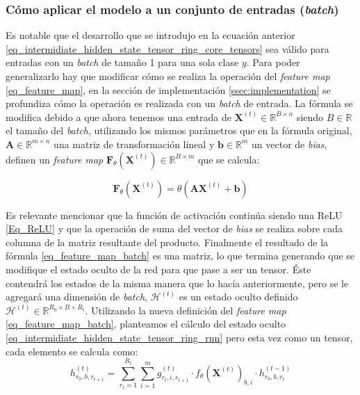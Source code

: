 \documentclass[spanish]{article}
\theoremstyle{definition}
\theoremstyle{remark}
\numberwithin{equation}{section}
\numberwithin{equation}{section} %
\begin{document}
\subsubsection{Cómo aplicar el modelo a un conjunto de entradas ({\it batch})}

Es notable que el desarrollo que se introdujo en la ecuación anterior \eqref{eq_intermidiate_hidden_state_tensor_ring_core_tensors} sea válido para entradas con un \textit{batch} de tamaño 1 para una sola clase $y$. Para poder generalizarlo hay que modificar cómo se realiza la operación del \textit{feature map} \eqref{eq_feature_map}, en la sección de implementación \ref{ssec:implementation} se profundiza cómo la operación es realizada con un \textit{batch} de entrada. La fórmula se modifica debido a que ahora tenemos una entrada de $\boldsymbol{X}^{(t)} \in \mathbb{R}^{B \times n}$ siendo $B \in \mathbb{R}$ el tamaño del \textit{batch}, utilizando los mismos parámetros que en la fórmula original, $\boldsymbol{A} \in \mathbb{R}^{m \times n}$ una matriz de transformación lineal y $\boldsymbol{b} \in \mathbb{R}^{m}$ un vector de \textit{bias}, definen un \textit{feature map} $\boldsymbol{F}_\theta(\boldsymbol{X}^{(t)}) \in \mathbb{R}^{B\times m}$ que se calcula:
\par
\begin{equation}
\label{eq_feature_map_batch}
\boldsymbol{F}_\theta(\boldsymbol{X}^{(t)})=\theta(\boldsymbol{A}\boldsymbol{X}^{(t)} +\boldsymbol{b})
\end{equation}\par
Es relevante mencionar que la función de activación continúa siendo una ReLU \eqref{Eq_ReLU} y que la operación de suma del vector de \textit{bias} se realiza sobre cada columna de la matriz resultante del producto. Finalmente el resultado de la fórmula \eqref{eq_feature_map_batch} es una matriz, lo que termina generando que se modifique el estado oculto de la red para que pase a ser un tensor. Éste contendrá los estados de la misma manera que lo hacía anteriormente, pero se le agregará una dimensión de \textit{batch}, $\mathcal{H}^{(t)}$ es un estado oculto definido $\mathcal{H}^{(t)} \in \mathbb{R}^{R_0 \times B \times R_t}$. Utilizando la nueva definición del \textit{feature map} \eqref{eq_feature_map_batch}, planteamos el cálculo del estado oculto \eqref{eq_intermidiate_hidden_state_tensor_ring_rnn} pero esta vez como un tensor, cada elemento se calcula como:
\begin{equation}
\label{eq_intermidiate_hidden_state_tensor_ring_core_tensors_element_with_batch}
h^{(t)}_{r_{0},b,r_{t+1}}  = \sum^{R_{t}}_{r_{t}=1} \sum_{i=1}^m  g^{(t)}_{r_t,i,r_{t+1}} \cdot f_\theta(\boldsymbol{X}^{(t)})_{b,i}  \cdot h^{(t-1)}_{r_{0},b,r_{t}} 
\end{equation}\par
\end{document}
